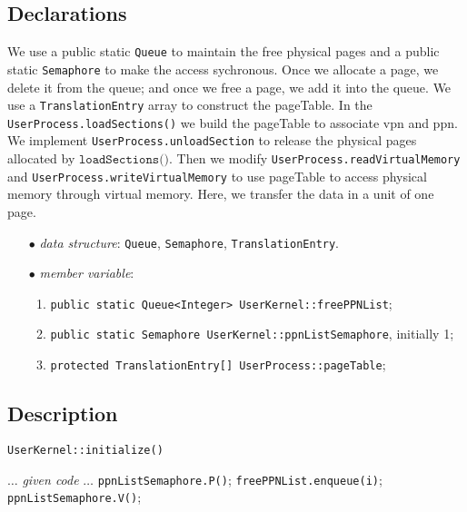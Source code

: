 \documentclass{article}
\begin{document}
\begin{spacing}{1.1}
\subsection{Declarations}
We use a public static \texttt{Queue} to maintain the free physical pages and a public
static \texttt{Semaphore} to make the access sychronous. Once we allocate a
page, we delete it from the queue; and once we free a page, we add it
into the queue. We use a 
\texttt{TranslationEntry} array to construct the pageTable. In the 
\texttt{UserProcess.loadSections()} we build the pageTable to associate vpn and ppn.
We implement \texttt{UserProcess.unloadSection} to release the physical pages
allocated by $\texttt{loadSections()}$.
Then we modify \texttt{UserProcess.readVirtualMemory} and 
\texttt{UserProcess.writeVirtualMemory} to use pageTable to access physical
memory through virtual memory. Here, we transfer the data in a unit of one page.
\begin{enumerate}
  \item[$\bullet$] \textit{data structure}: \texttt{Queue}, \texttt{Semaphore},
    \texttt{TranslationEntry}.
  \item[$\bullet$] \textit{member variable}:
    \begin{enumerate}
      \item \texttt{public static Queue<Integer> UserKernel::freePPNList};
      \item \texttt{public static Semaphore UserKernel::ppnListSemaphore}, initially 1;
      \item \texttt{protected TranslationEntry[] UserProcess::pageTable};
      \end{enumerate}
\end{enumerate}

\subsection{Description}
\begin{algorithm}[htbp]
  \caption{\texttt{UserKernel::initialize()}}
  \begin{algorithmic}[1]
    \STATE $\dots$ \textit{given code} $\dots$
    \STATE \texttt{ppnListSemaphore.P()};
    \STATE \texttt{freePPNList.enqueue(i)};
    \ENDFOR
    \STATE \texttt{ppnListSemaphore.V()};
  \end{algorithmic}
\end{algorithm}


\end{spacing}
\end{document}
